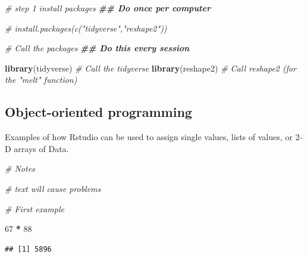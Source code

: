 \documentclass[
]{book}
\newenvironment{Shaded}{\begin{snugshade}}{\end{snugshade}}
\newcommand{\CommentTok}[1]{\textcolor[rgb]{0.56,0.35,0.01}{\textit{#1}}}
\newcommand{\DecValTok}[1]{\textcolor[rgb]{0.00,0.00,0.81}{#1}}
\newcommand{\DocumentationTok}[1]{\textcolor[rgb]{0.56,0.35,0.01}{\textbf{\textit{#1}}}}
\newcommand{\FunctionTok}[1]{\textcolor[rgb]{0.13,0.29,0.53}{\textbf{#1}}}
\newcommand{\NormalTok}[1]{#1}
\newcommand{\SpecialCharTok}[1]{\textcolor[rgb]{0.81,0.36,0.00}{\textbf{#1}}}
\begin{document}
\begin{Shaded}
\begin{Highlighting}[]
\CommentTok{\# step 1 install packages }
\DocumentationTok{\#\# Do once per computer}

\CommentTok{\# install.packages(c("tidyverse","reshape2"))}

\CommentTok{\# Call the packages }
\DocumentationTok{\#\# Do this every session}

\FunctionTok{library}\NormalTok{(tidyverse) }\CommentTok{\# Call the tidyverse}
\FunctionTok{library}\NormalTok{(reshape2) }\CommentTok{\# Call reshape2 (for the "melt" function)}
\end{Highlighting}
\end{Shaded}

\subsection*{Object-oriented programming}\label{object-oriented-programming}

Examples of how Rstudio can be used to assign single values, lists of values, or 2-D arrays of Data.

\begin{Shaded}
\begin{Highlighting}[]
\CommentTok{\# Notes }

\CommentTok{\# text will cause problems }

\CommentTok{\# First example }

\DecValTok{67} \SpecialCharTok{*} \DecValTok{88}
\end{Highlighting}
\end{Shaded}

\begin{verbatim}
## [1] 5896
\end{verbatim}
\end{document}
